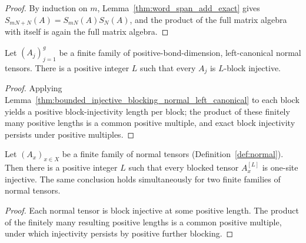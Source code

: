 \begin{proof}
    \leanok
    By induction on $m$, Lemma~\ref{thm:word_span_add_exact} gives
    $S_{mN+N}(A)=S_{mN}(A)S_N(A)$, and the product of the full matrix
    algebra with itself is again the full matrix algebra.
\end{proof}

\begin{lemma}
    \label{thm:common_exact_block_injectivity_normal_left_canonical}
    \leanok
    Let $(A_j)_{j=1}^g$ be a finite family of positive-bond-dimension,
    left-canonical normal tensors. There is a positive integer $L$ such that
    every $A_j$ is $L$-block injective.
\end{lemma}

\begin{proof}\leanok
    Applying
    Lemma~\ref{thm:bounded_injective_blocking_normal_left_canonical} to each
    block yields a positive block-injectivity length per block; the product of
    these finitely many positive lengths is a common positive multiple, and
    exact block injectivity persists under positive multiples.
\end{proof}

\begin{corollary}%
    \label{cor:uniform_injective_blocking_normal_bnt}
    \leanok
    Let $(A_x)_{x\in X}$ be a finite family of normal tensors
    (Definition~\ref{def:normal}). Then there is a positive integer $L$ such that
    every blocked tensor $A_x^{[L]}$ is one-site injective. The same conclusion
    holds simultaneously for two finite families of normal tensors.
\end{corollary}

\begin{proof}
    \leanok
    Each normal tensor is block injective at some positive length. The
    product of the finitely many resulting positive lengths is a common
    positive multiple, under which injectivity persists by positive further
    blocking.
\end{proof}

